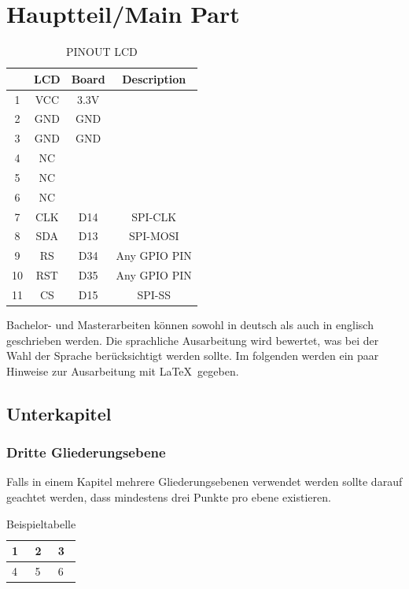 \chapter{Hauptteil/Main Part}

\begin{table}[h]
	\centering
	\begin{tabular}{|c|c|c|c|}
		\hline
		&LCD&Board&Description\\\hline
		1&VCC&3.3V\\\hline
		2&GND&GND\\\hline
		3&GND&GND\\\hline
		4&NC \\\hline
		5&NC \\\hline
		6&NC \\\hline
		7&CLK&D14&SPI-CLK\\\hline
		8&SDA&D13&SPI-MOSI\\\hline
		9&RS&D34&Any GPIO PIN\\\hline
		10&RST&D35&Any GPIO PIN\\\hline
		11&CS&D15&SPI-SS\\\hline
	\end{tabular}
	\caption{PINOUT LCD}
	\label{Tab:PINOUT_LCD}
\end{table}

Bachelor- und Masterarbeiten können sowohl in deutsch als auch in englisch geschrieben werden. 
Die sprachliche Ausarbeitung wird bewertet, was bei der Wahl der Sprache berücksichtigt werden sollte. 
Im folgenden werden ein paar Hinweise zur Ausarbeitung  mit \LaTeX\ gegeben.


\section{Unterkapitel}
\subsection{Dritte Gliederungsebene}
Falls in einem Kapitel mehrere Gliederungsebenen verwendet werden sollte darauf geachtet werden, dass mindestens drei Punkte pro ebene existieren. 

\begin{table}[h]
	\centering
	\begin{tabular}{|l|l|l|}
		\hline
		1&2&3\\\hline
		4&5&6\\\hline
	\end{tabular}
	\caption{Beispieltabelle}
	\label{Tab:Beispieltabelle}
\end{table}

